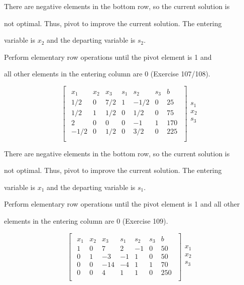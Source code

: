 \documentclass{article}
\begin{document}
There are negative elements in the bottom row, so the current solution is 

not optimal. Thus, pivot to improve the current solution. The entering 

variable is \(x_2\) and the departing variable is \(s_2\).

\vspace{\baselineskip}

Perform elementary row operations until the pivot element is 1 and 

all other elements in the entering column are 0 (Exercise 107/108).

\[
\begin{bmatrix}
\begin{array}{cccccc|c}
x_1 & x_2 & x_3 & s_1 & s_2 & s_3 & b \\
\hline
1/2 & 0 & 7/2 & 1 & -1/2 & 0 & 25 \\
1/2 & 1 & 1/2 & 0 & 1/2 & 0 & 75 \\
2 & 0 & 0 & 0 & -1 & 1 & 170 \\
\hline
-1/2 & 0 & 1/2 & 0 & 3/2 & 0 & 225 \\
\end{array}
\end{bmatrix}
\begin{array}{c}
\\
s_1 \\
x_2 \\
s_3 \\
\\
\end{array}
\]

There are negative elements in the bottom row, so the current solution is 

not optimal. Thus, pivot to improve the current solution. The entering 

variable is \(x_1\) and the departing variable is \(s_1\).

\vspace{\baselineskip}

Perform elementary row operations until the pivot element is 1 and all other 

elements in the entering column are 0 (Exercise 109).

\[
\begin{bmatrix}
\begin{array}{cccccc|c}
x_1 & x_2 & x_3 & s_1 & s_2 & s_3 & b \\
\hline
1 & 0 & 7 & 2 & -1 & 0 & 50 \\
0 & 1 & -3 & -1 & 1 & 0 & 50 \\
0 & 0 & -14 & -4 & 1 & 1 & 70 \\
\hline
0 & 0 & 4 & 1 & 1 & 0 & 250 \\
\end{array}
\end{bmatrix}
\begin{array}{c}
\\
x_1 \\
x_2 \\
s_3 \\
\\
\end{array}
\]
\end{document}
